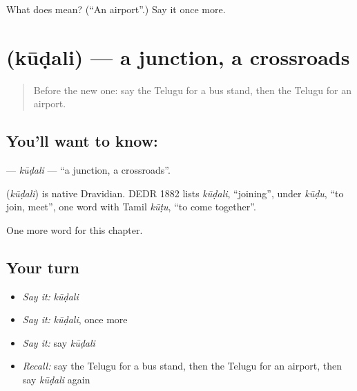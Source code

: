 \begin{tcolorbox}[breakable,colback=teal!4,colframe=teal!35!black,title={Before you move on}]
What does  mean? (\textquotedblleft{}An airport\textquotedblright{}.) Say it once more.
\end{tcolorbox}
\section[\texorpdfstring{\te{కూడలి} (kūḍali)}{కూడలి (kūḍali)}]{ (kūḍali) — a junction, a crossroads}

\label{lesson:TE-C214-kudali}



\begin{quote}
Before the new one: say the Telugu for a bus stand, then the Telugu for an airport.
\end{quote}

\subsection*{You'll want to know: }
\textbf{} — \emph{kūḍali} — \textquotedblleft{}a junction, a crossroads\textquotedblright{}.

\begin{cousinweb}
\textbf{} (\emph{kūḍali}) is native Dravidian. DEDR 1882 lists \emph{kūḍali}, \textquotedblleft{}joining\textquotedblright{}, under \emph{kūḍu}, \textquotedblleft{}to join, meet\textquotedblright{}, one word with Tamil \emph{kūṭu}, \textquotedblleft{}to come together\textquotedblright{}.
\end{cousinweb}

\begin{grammarlens}[title={What you've built}]
One more word for this chapter.
\end{grammarlens}

\subsection*{Your turn}
\begin{itemize}
\raggedright
  \item \emph{Say it:} \emph{kūḍali}
  \item \emph{Say it:} \emph{kūḍali}, once more
  \item \emph{Say it:} say \emph{kūḍali}
  \item \emph{Recall:} say the Telugu for a bus stand, then the Telugu for an airport, then say \emph{kūḍali} again
\end{itemize}

